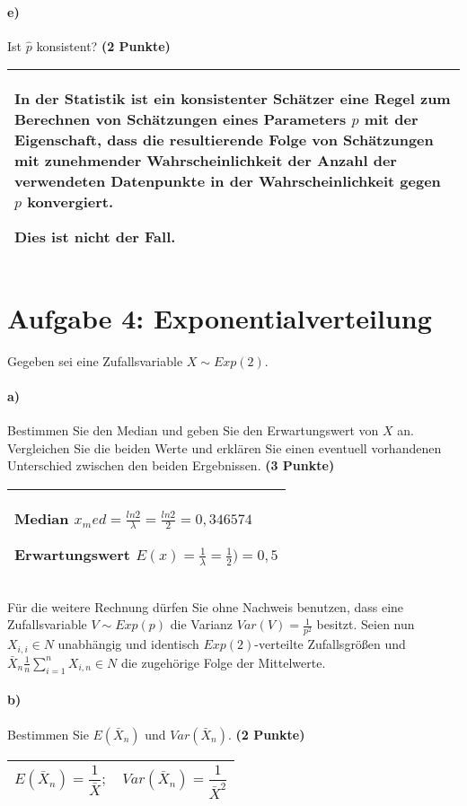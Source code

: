 \documentclass[10pt, a4paper]{article}
\begin{document}
\paragraph{e)} Ist $\hat{p}$ konsistent? \textbf{(2 Punkte)}\\
\begin{tabular}{| p{17cm} |}
    \hline
    In der Statistik ist ein konsistenter Schätzer eine Regel zum Berechnen von Schätzungen eines Parameters $p$ mit der Eigenschaft, dass die resultierende Folge von Schätzungen mit zunehmender Wahrscheinlichkeit der Anzahl der verwendeten Datenpunkte in der Wahrscheinlichkeit gegen $p$ konvergiert.

    Dies ist nicht der Fall.
    \\\hline
\end{tabular}

\section{Aufgabe 4: Exponentialverteilung}
Gegeben sei eine Zufallsvariable $X \sim Exp(2)$.
\paragraph{a)} Bestimmen Sie den Median und geben Sie den Erwartungswert von $X$ an. Vergleichen Sie die beiden Werte und erklären Sie einen eventuell vorhandenen Unterschied zwischen den beiden Ergebnissen. \textbf{(3 Punkte)}\\
\begin{tabular}{| p{17cm} |}
    \hline
    Median $x_med=\frac{ln 2}{\lambda}=\frac{ln 2}{2} = 0,346574$

    Erwartungswert $E(x)=\frac{1}{\lambda}= \frac{1}{2} ) = 0,5$
    \\\hline
\end{tabular}

Für die weitere Rechnung dürfen Sie ohne Nachweis benutzen, dass eine Zufallsvariable $V\sim Exp(p)$ die Varianz $Var(V) =\frac{1}{p^2}$ besitzt. Seien nun $X_{i,i}\in N$ unabhängig und identisch $Exp(2)$-verteilte Zufallsgrößen und $\bar{X}_n \frac{1}{n}\sum_{i=1}^{n} X_{i,n}\in N$ die zugehörige Folge der Mittelwerte.
\paragraph{b)} Bestimmen Sie $E(\bar{X}_n)$ und $Var(\bar{X}_n)$. \textbf{(2 Punkte)}\\
\begin{tabular}{| p{17cm} |}
    \hline
    $$E(\bar{X}_n) = \frac{1}{\bar{X}} ;\quad
    Var(\bar{X}_n) = \frac{1}{\bar{X}^2} $$
    \\\hline
\end{tabular}
\end{document}
